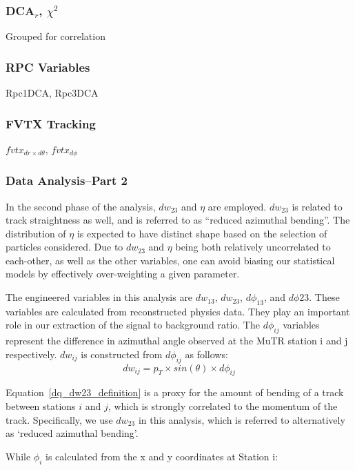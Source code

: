 \subsubsection{DCA$_r$, $\chi^2$}

Grouped for correlation

\subsubsection{RPC Variables}
Rpc1DCA, Rpc3DCA

\subsubsection{FVTX Tracking}
$fvtx_{dr \times d\theta}$, $fvtx_{d\phi}$

\subsubsection{Data Analysis--Part 2}

In the second phase of the analysis, $dw_{23}$ and $\eta$ are employed.
$dw_{23}$ is related to track straightness as well, and is referred to as
``reduced azimuthal bending''. The distribution of $\eta$ is expected to have
distinct shape based on the selection of particles considered. Due to $dw_{23}$
and $\eta$ being both relatively uncorrelated to each-other, as well as the
other variables, one can avoid biasing our statistical models by effectively
over-weighting a given parameter.

The engineered variables in this analysis are $dw_{13}$, $dw_{23}$,
$d\phi_{13}$, and $d\phi{23}$.  These variables are calculated from
reconstructed physics data. They play an important role in our extraction of the
signal to background ratio.  The $d\phi_{ij}$ variables represent the difference
in azimuthal angle observed at the MuTR station i and j respectively.  $dw_{ij}$
is constructed from $d\phi_{ij}$ as follows:
\begin{equation}
  dw_{ij} = p_T \times sin(\theta) \times d\phi_{ij}
  \label{eq:dw23_definition}
\end{equation}

{\noindent}Equation~\ref{dq_dw23_definition} is a proxy for the amount of
bending of a track between stations $i$ and $j$, which is strongly correlated to
the momentum of the track. Specifically, we use $dw_{23}$ in this analysis,
which is referred to alternatively as `reduced azimuthal bending'. 

While $\phi_{i}$ is calculated from the x and y coordinates at Station i:

